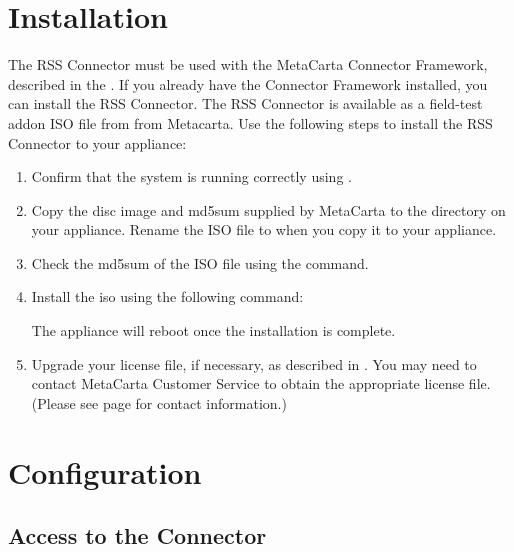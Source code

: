 \begin{changemargin}{1.5in}{0in}
\section{Installation}

The RSS Connector must be used with the MetaCarta Connector Framework,
described in the . If you
already have the Connector Framework installed, you can install the
RSS Connector.  The RSS Connector is available as a field-test addon
ISO file from from Metacarta. Use the following steps to install the
RSS Connector to your appliance:

\begin{enumerate}

\item Confirm that the system is running correctly using
.

\item Copy the disc image and md5sum supplied by MetaCarta to the
 directory on your appliance. Rename the ISO file to
 when you copy it to your appliance.

\item Check the md5sum of the ISO file using the  command.

\item Install the iso using the following command:


The appliance will reboot once the installation is complete.

\item Upgrade your license file, if necessary, as described in
. You may need
to contact MetaCarta Customer Service to obtain the appropriate
license file. (Please see page \pageref{SupportContact} for contact
information.)
 
\end{enumerate}

\section{Configuration}

\subsection{Access to the Connector}


\end{changemargin}
